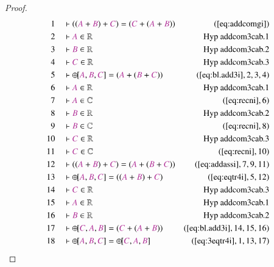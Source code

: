 \begin{proof}
\begin{align}
  1 &&  & \vdash ( ( \mc{A} + \mc{B} ) + \mc{C} ) = ( \mc{C} + ( \mc{A} +
      \mc{B} ) )&(\mbox{\ref{eq:addcomgi}})\notag
  \\ 2 &&  & \vdash \mc{A} \in
\mathbb{R}&\text{Hyp~addcom3cab.1}\notag%
  \\ 3 &&  & \vdash \mc{B} \in
\mathbb{R}&\text{Hyp~addcom3cab.2}\notag%
  \\ 4 &&  & \vdash \mc{C} \in
\mathbb{R}&\text{Hyp~addcom3cab.3}\notag%
  \\ 5 &&  & \vdash {\oplus\hspace{-1pt}[} \mc{A} , \mc{B} , \mc{C} ] = (
      \mc{A} + ( \mc{B} + \mc{C} )
      )&(\mbox{\ref{eq:bl.add3i}},2,3,4)\notag
  \\ 6 &&  & \vdash \mc{A} \in
\mathbb{R}&\text{Hyp~addcom3cab.1}\notag%
  \\ 7 &&  & \vdash \mc{A} \in \mathbb{C}&(\mbox{\ref{eq:recni}},6)\notag
  \\ 8 &&  & \vdash \mc{B} \in
\mathbb{R}&\text{Hyp~addcom3cab.2}\notag%
  \\ 9 &&  & \vdash \mc{B} \in \mathbb{C}&(\mbox{\ref{eq:recni}},8)\notag
  \\ 10 &&  & \vdash \mc{C} \in
\mathbb{R}&\text{Hyp~addcom3cab.3}\notag%
  \\ 11 &&  & \vdash \mc{C} \in \mathbb{C}&(\mbox{\ref{eq:recni}},10)\notag
  \\ 12 &&  & \vdash ( ( \mc{A} + \mc{B} ) + \mc{C} ) = ( \mc{A} + ( \mc{B} +
      \mc{C} ) )&(\mbox{\ref{eq:addassi}},7,9,11)\notag
  \\ 13 &&  & \vdash {\oplus\hspace{-1pt}[} \mc{A} , \mc{B} , \mc{C} ] = ( (
      \mc{A} + \mc{B} ) + \mc{C}
      )&(\mbox{\ref{eq:eqtr4i}},5,12)\notag
  \\ 14 &&  & \vdash \mc{C} \in
\mathbb{R}&\text{Hyp~addcom3cab.3}\notag%
  \\ 15 &&  & \vdash \mc{A} \in
\mathbb{R}&\text{Hyp~addcom3cab.1}\notag%
  \\ 16 &&  & \vdash \mc{B} \in
\mathbb{R}&\text{Hyp~addcom3cab.2}\notag%
  \\ 17 &&  & \vdash {\oplus\hspace{-1pt}[} \mc{C} , \mc{A} , \mc{B} ] = (
      \mc{C} + ( \mc{A} + \mc{B} )
      )&(\mbox{\ref{eq:bl.add3i}},14,15,16)\notag
  \\ 18 &&  & \vdash {\oplus\hspace{-1pt}[} \mc{A} , \mc{B} , \mc{C} ] =
      {\oplus\hspace{-1pt}[} \mc{C} , \mc{A} , \mc{B}
      ]&(\mbox{\ref{eq:3eqtr4i}},1,13,17)\notag
\end{align}
\end{proof}

